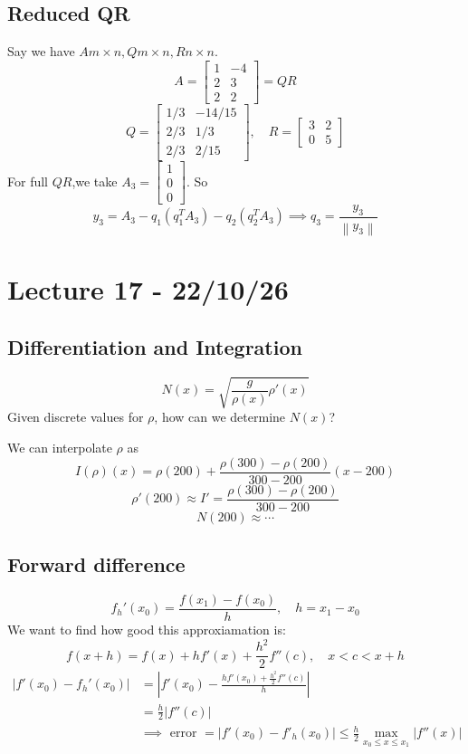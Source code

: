 \documentclass[11pt]{article}
\begin{document}
\subsection{Reduced QR}
\begin{example}
    Say we have $A m \times n, Q m\times n, R n \times n$.
\[
    A = \begin{bmatrix}
        1 & -4\\2 & 3\\ 2 & 2
    \end{bmatrix} = QR
\]
\[
    Q = \begin{bmatrix}
        1/3 & -14/15 \\ 2/3 & 1/3 \\ 2/3 & 2/15
    \end{bmatrix}, \quad
    R = \begin{bmatrix}
        3 & 2 \\ 0 & 5
    \end{bmatrix}
\]
For full $QR$,we take $A_3 =
\begin{bmatrix}
    1 \\ 0 \\ 0
\end{bmatrix}$. So 
\[
    y_3 = A_3 - q_1(q_1^TA_3)- q_2(q_2^T A_3) \implies q_3 = \frac{y_3}{\left\|y_3\right\|}
\]

\end{example}

\section{Lecture 17 - 22/10/26}

\subsection{Differentiation and Integration}
\begin{example}
    \[
        N(x) = \sqrt{\frac{g}{\rho(x)}\rho'(x)}
    \]
    Given discrete values for $\rho$, how can we determine $N(x)$?

    We can interpolate $\rho$ as 
    \[
        I(\rho)(x) = \rho(200) + \frac{\rho(300)-\rho(200)}{300-200}(x-200)
    \]
    \[
       \rho'(200) \approx I' = \frac{\rho(300)-\rho(200)}{300-200} 
    \]
    \[
        N(200) \approx \cdots
    \]
\end{example}

\subsection{Forward difference}
\[
    f_h'(x_0) = \frac{f(x_1)-f(x_0)}{h}, \quad h = x_1 - x_0
\]
We want to find how good this approxiamation is:
\[
    f(x+h) = f(x)+hf'(x)+\frac{h^2}{2}f''(c), \quad x < c < x+h
\]
\begin{align*}
    |f'(x_0) - f_h'(x_0)| &= | f'(x_0) - \frac{hf'(x_0)+\frac{h^2}{2}f''(c)}{h}|\\
    &= \frac{h}{2}|f''(c)|\\
    &\implies \text{ error } =  |f'(x_0) - f'_h(x_0)| \le \frac{h}{2}\max_{x_0 \le x \le x_1}|f''(x)|
\end{align*}
\end{document}
